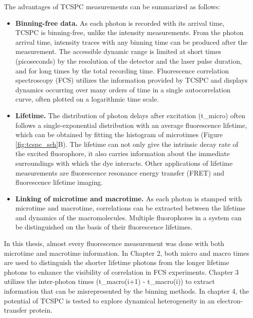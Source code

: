 The advantages of TCSPC measurements can be summarized as follows:
\begin{itemize}
	\item \textbf{Binning-free data.} As each photon is recorded with its arrival time, TCSPC is binning-free, unlike the intensity measurements.
	From the photon arrival time, intensity traces with any binning time can be produced after the measurement.
	The accessible dynamic range is limited at short times (picoseconds) by the resolution of the detector and the laser pulse duration, and for long times by the total recording time.
	Fluorescence correlation spectroscopy (FCS) utilizes the information provided by TCSPC and displays dynamics occurring over many orders of time in a single autocorrelation curve, often plotted on a logarithmic time scale.
	\item \textbf{Lifetime.} The distribution of photon delays after excitation (t\_micro) often follows a single-exponential distribution with an average fluorescence lifetime, which can be obtained by fitting the histogram of microtimes (Figure \ref{fig:tcspc_sch}B).
	The lifetime can not only give the intrinsic decay rate of the excited fluorophore, it also carries information about the immediate surroundings with which the dye interacts.
	Other applications of lifetime measurements are fluorescence resonance energy transfer (FRET) and fluorescence lifetime imaging.\cite{selvin2000the,lakowicz1992fluorescence} 
	\item \textbf{Linking of microtime and macrotime.} As each photon is stamped with microtime and macrotime, correlations can be extracted between the lifetime and dynamics of the macromolecules.
	Multiple fluorophores in a system can be distinguished on the basis of their fluorescence lifetimes.
\end{itemize}
In this thesis, almost every fluorescence measurement was done with both microtime and macrotime information.
In Chapter 2, both micro and macro times are used to distinguish the shorter lifetime photons from the longer lifetime photons to enhance the visibility of correlation in FCS experiments.
Chapter 3 utilizes the inter-photon times (t\_macro(i+1) - t\_macro(i)) to extract information that can be misrepresented by the binning methods.
In chapter 4, the potential of TCSPC is tested to explore dynamical heterogeneity in an electron-transfer protein. 


